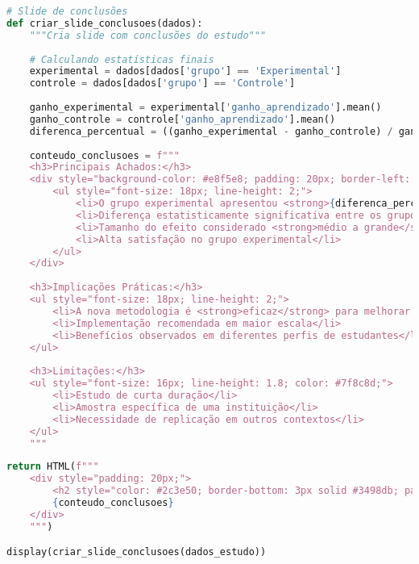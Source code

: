 \begin{pythonbox}
\begin{lstlisting}[language=Python]
# Slide de conclusões
def criar_slide_conclusoes(dados):
    """Cria slide com conclusões do estudo"""
    
    # Calculando estatísticas finais
    experimental = dados[dados['grupo'] == 'Experimental']
    controle = dados[dados['grupo'] == 'Controle']
    
    ganho_experimental = experimental['ganho_aprendizado'].mean()
    ganho_controle = controle['ganho_aprendizado'].mean()
    diferenca_percentual = ((ganho_experimental - ganho_controle) / ganho_controle) * 100
    
    conteudo_conclusoes = f"""
    <h3>Principais Achados:</h3>
    <div style="background-color: #e8f5e8; padding: 20px; border-left: 5px solid #27ae60; margin: 20px 0;">
        <ul style="font-size: 18px; line-height: 2;">
            <li>O grupo experimental apresentou <strong>{diferenca_percentual:.1f}% mais ganho</strong> de aprendizado</li>
            <li>Diferença estatisticamente significativa entre os grupos (p < 0.05)</li>
            <li>Tamanho do efeito considerado <strong>médio a grande</strong></li>
            <li>Alta satisfação no grupo experimental</li>
        </ul>
    </div>
    
    <h3>Implicações Práticas:</h3>
    <ul style="font-size: 18px; line-height: 2;">
        <li>A nova metodologia é <strong>eficaz</strong> para melhorar o aprendizado</li>
        <li>Implementação recomendada em maior escala</li>
        <li>Benefícios observados em diferentes perfis de estudantes</li>
    </ul>
    
    <h3>Limitações:</h3>
    <ul style="font-size: 16px; line-height: 1.8; color: #7f8c8d;">
        <li>Estudo de curta duração</li>
        <li>Amostra específica de uma instituição</li>
        <li>Necessidade de replicação em outros contextos</li>
    </ul>
    """
       \end{lstlisting}
\end{pythonbox}

\begin{pythonbox}
\begin{lstlisting}[language=Python]       
    return HTML(f"""
    <div style="padding: 20px;">
        <h2 style="color: #2c3e50; border-bottom: 3px solid #3498db; padding-bottom: 10px; margin-bottom: 30px;">Conclusões</h2>
        {conteudo_conclusoes}
    </div>
    """)

display(criar_slide_conclusoes(dados_estudo))
\end{lstlisting}
\end{pythonbox}

